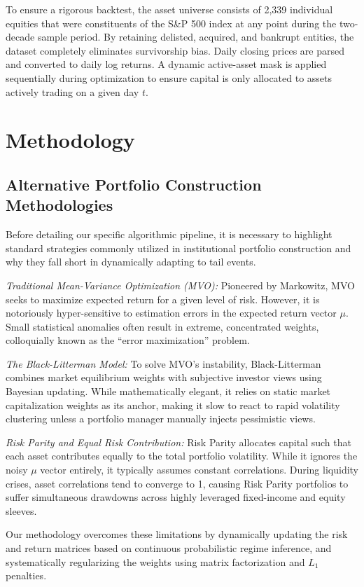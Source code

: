 \documentclass[12pt]{article}
\begin{document}
To ensure a rigorous backtest, the asset universe consists of 2,339 individual equities that were constituents of the S\&P 500 index at any point during the two-decade sample period. By retaining delisted, acquired, and bankrupt entities, the dataset completely eliminates survivorship bias. Daily closing prices are parsed and converted to daily log returns. A dynamic active-asset mask is applied sequentially during optimization to ensure capital is only allocated to assets actively trading on a given day $t$.
\newpage
\section{Methodology}

\subsection{Alternative Portfolio Construction Methodologies}
Before detailing our specific algorithmic pipeline, it is necessary to highlight standard strategies commonly utilized in institutional portfolio construction and why they fall short in dynamically adapting to tail events.

\textit{Traditional Mean-Variance Optimization (MVO):} Pioneered by Markowitz, MVO seeks to maximize expected return for a given level of risk. However, it is notoriously hyper-sensitive to estimation errors in the expected return vector $\mu$. Small statistical anomalies often result in extreme, concentrated weights, colloquially known as the ``error maximization'' problem.

\textit{The Black-Litterman Model:} To solve MVO's instability, Black-Litterman combines market equilibrium weights with subjective investor views using Bayesian updating. While mathematically elegant, it relies on static market capitalization weights as its anchor, making it slow to react to rapid volatility clustering unless a portfolio manager manually injects pessimistic views.

\textit{Risk Parity and Equal Risk Contribution:} Risk Parity allocates capital such that each asset contributes equally to the total portfolio volatility. While it ignores the noisy $\mu$ vector entirely, it typically assumes constant correlations. During liquidity crises, asset correlations tend to converge to 1, causing Risk Parity portfolios to suffer simultaneous drawdowns across highly leveraged fixed-income and equity sleeves.

Our methodology overcomes these limitations by dynamically updating the risk and return matrices based on continuous probabilistic regime inference, and systematically regularizing the weights using matrix factorization and $L_1$ penalties.
\end{document}
